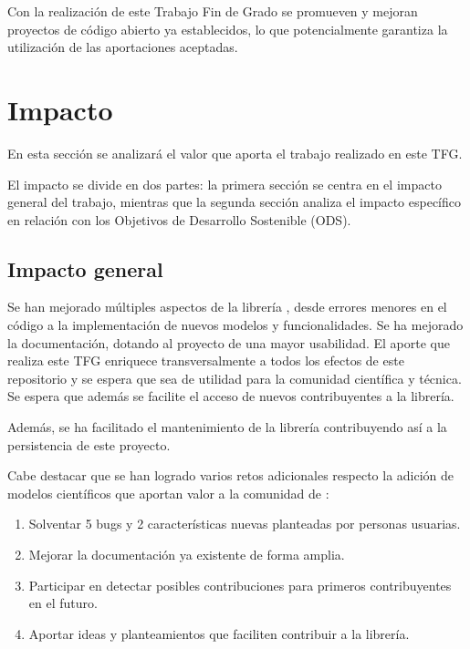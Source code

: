 Con la realización de este Trabajo Fin de Grado se promueven y mejoran proyectos de código abierto ya establecidos, lo que potencialmente garantiza la utilización de las aportaciones aceptadas.


\section{Impacto} \label{sct:resultados:impacto}

En esta sección se analizará el valor que aporta el trabajo realizado en este TFG.

El impacto se divide en dos partes: la primera sección se centra en el impacto general del trabajo, mientras que la segunda sección analiza el impacto específico en relación con los Objetivos de Desarrollo Sostenible (ODS).


\subsection{Impacto general} \label{sssct:impacto:general}

Se han mejorado múltiples aspectos de la librería \pvlibpy{}, desde errores menores en el código a la implementación de nuevos modelos y funcionalidades. Se ha mejorado la documentación, dotando al proyecto de una mayor usabilidad. El aporte que realiza este TFG enriquece transversalmente a todos los efectos de este \gls{repositorio} y se espera que sea de utilidad para la comunidad científica y técnica. Se espera que además se facilite el acceso de nuevos contribuyentes a la librería.

Además, se ha facilitado el mantenimiento de la librería \pvlibpy{} contribuyendo así a la persistencia de este proyecto.

Cabe destacar que se han logrado varios retos adicionales respecto la adición de modelos científicos que aportan valor a la comunidad de \pvlibpy{}:

\begin{enumerate}
    \item Solventar 5 bugs y 2 características nuevas planteadas por personas usuarias.
    \item Mejorar la documentación ya existente de forma amplia.
    \item Participar en detectar posibles contribuciones para primeros contribuyentes en el futuro.
    \item Aportar ideas y planteamientos que faciliten contribuir a la librería.
\end{enumerate}

